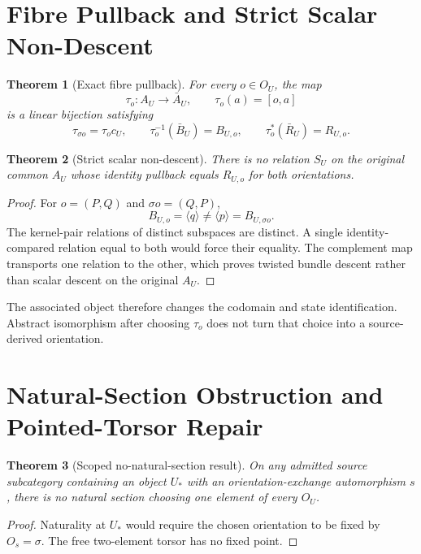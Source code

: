 \documentclass[11pt]{article}
\newtheorem{theorem}{Theorem}
\begin{document}
\section{Fibre Pullback and Strict Scalar Non-Descent}

\begin{theorem}[Exact fibre pullback]
For every \(o\in O_U\), the map
\[
\tau_o:A_U\longrightarrow\bar A_U,\qquad \tau_o(a)=[o,a]
\]
is a linear bijection satisfying
\[
\tau_{\sigma o}=\tau_oc_U,\qquad
\tau_o^{-1}(\bar B_U)=B_{U,o},\qquad
\tau_o^*(\bar R_U)=R_{U,o}.
\]
\end{theorem}

\begin{theorem}[Strict scalar non-descent]
There is no relation \(S_U\) on the original common \(A_U\) whose identity
pullback equals \(R_{U,o}\) for both orientations.
\end{theorem}

\begin{proof}
For \(o=(P,Q)\) and \(\sigma o=(Q,P)\),
\[
B_{U,o}=\langle q\rangle\neq\langle p\rangle=B_{U,\sigma o}.
\]
The kernel-pair relations of distinct subspaces are distinct. A single
identity-compared relation equal to both would force their equality. The
complement map transports one relation to the other, which proves twisted
bundle descent rather than scalar descent on the original \(A_U\).
\end{proof}

The associated object therefore changes the codomain and state
identification. Abstract isomorphism after choosing \(\tau_o\) does not turn
that choice into a source-derived orientation.

\section{Natural-Section Obstruction and Pointed-Torsor Repair}

\begin{theorem}[Scoped no-natural-section result]
On any admitted source subcategory containing an object \(U_*\) with an
orientation-exchange automorphism \(s\), there is no natural section choosing
one element of every \(O_U\).
\end{theorem}

\begin{proof}
Naturality at \(U_*\) would require the chosen orientation to be fixed by
\(O_s=\sigma\). The free two-element torsor has no fixed point.
\end{proof}
\end{document}
